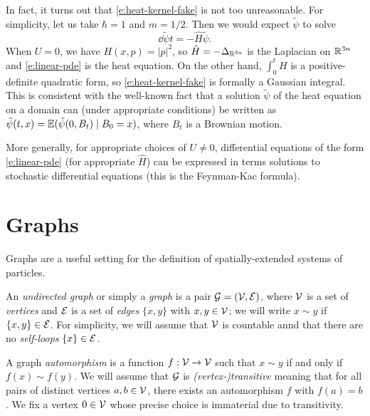 \begin{rk}
In fact, it turns out that \eqref{e:heat-kernel-fake} is not too unreasonable.
For simplicity, let us take $\hbar = 1$ and $m = 1/2$.
Then we would expect $\tilde\psi$ to solve
\begin{equation}
\label{e:linear-pde}
\dd{\tilde\psi}{t} = -\hat H \tilde\psi.
\end{equation}
When $U = 0$, we have $H(x, p) = |p|^2$, so $\hat H = -\Delta_{{\mathbb R}^{3n}}$
is the Laplacian on ${\mathbb R}^{3n}$ and \eqref{e:linear-pde} is the heat equation.
On the other hand, $\int_0^t H$ is a positive-definite quadratic form, so
\eqref{e:heat-kernel-fake} is formally a Gaussian integral. This is consistent
with the well-known fact that a solution $\tilde\psi$ of the heat equation
on a domain can (under appropriate conditions) be written as
$\tilde\psi(t, x) = \mathbb{E}(\tilde\psi(0, B_t) \mid B_0 = x)$,
where $B_t$ is a Brownian motion.

More generally, for appropriate choices of $U \ne 0$, differential equations of
the form \eqref{e:linear-pde} (for appropriate $\hat H$) can be expressed in terms
solutions to stochastic differential equations (this is the Feynman-Kac formula).
\end{rk}


\section{Graphs}
\label{sec:graphs}

Graphs are a useful setting for the definition of spatially-extended systems of
particles.

An \emph{undirected graph} or simply a \emph{graph} is a pair $\mathcal{G} = (\mathcal{V}, \mathcal{E})$,
where $\mathcal{V}$
is a set of \emph{vertices} and $\mathcal{E}$ is a set of
\emph{edges} $\{ x, y \}$ with $x, y \in \mathcal{V}$; we will write $x \sim y$ if
$\{ x, y \} \in \mathcal{E}$.
For simplicity, we will assume that $\mathcal{V}$ is countable annd that there are no
\emph{self-loops} $\{ x \} \in \mathcal{E}$.

A graph \emph{automorphism} is a function $f : \mathcal{V}\rightarrow\mathcal{V}$ such that
$x \sim y$ if and only if $f(x) \sim f(y)$.
We will assume that $\mathcal{G}$ is \emph{(vertex-)transitive} meaning that for all pairs
of distinct
vertices $a, b \in \mathcal{V}$, there exists an automorphism $f$ with $f(a) = b$.
We fix a vertex $0\in\mathcal{V}$ whose precise choice is immaterial due to
transitivity.

